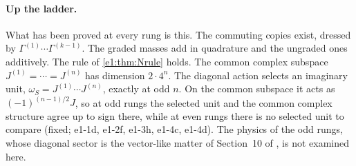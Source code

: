 \paragraph{Up the ladder.} What has been proved at every rung is this. The commuting copies exist, dressed by $\Gamma^{(1)}\cdots\Gamma^{(k-1)}$.
The graded masses add in quadrature and the ungraded ones additively. The rule of \cref{e1:thm:Nrule} holds. The common complex subspace
$J^{(1)}=\cdots=J^{(n)}$ has dimension $2\cdot4^n$. The diagonal action selects an imaginary unit, $\omega_S=J^{(1)}\cdots J^{(n)}$, exactly at
odd $n$. On the common subspace it acts as $(-1)^{(n-1)/2}J$, so at odd rungs the selected unit and the common complex structure agree up to
sign there, while at even rungs there is no selected unit to compare (fixed; e1-1d, e1-2f, e1-3h, e1-4c, e1-4d). The physics of the odd rungs, whose diagonal sector is the vector-like matter of Section~10 of \cite{ES17},
is not examined here.


